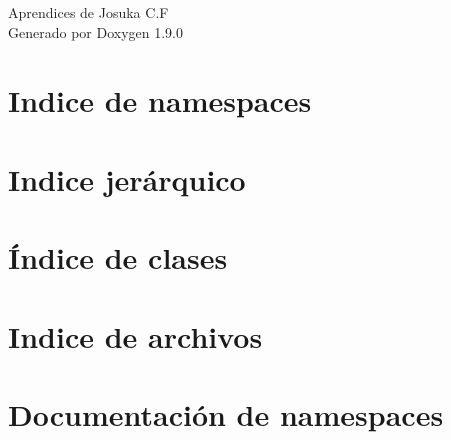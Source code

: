 \let\mypdfximage\pdfximage\def\pdfximage{\immediate\mypdfximage}\documentclass[twoside]{book}
\newcommand{\+}{\discretionary{\mbox{\scriptsize$\hookleftarrow$}}{}{}}
\newcommand{\clearemptydoublepage}{%
  \newpage{\pagestyle{empty}\cleardoublepage}%
}
\begin{document}
\raggedbottom

\hypersetup{pageanchor=false,
             bookmarksnumbered=true,
             pdfencoding=unicode
            }
\begin{titlepage}
\vspace*{7cm}
\begin{center}%
{\Large Aprendices de Josuka C.\+F }\\
\vspace*{1cm}
{\large Generado por Doxygen 1.9.0}\\
\end{center}
\end{titlepage}
\clearemptydoublepage
{}
\tableofcontents
\clearemptydoublepage
{}
\hypersetup{pageanchor=true}

\chapter{Indice de namespaces}

\chapter{Indice jerárquico}

\chapter{Índice de clases}

\chapter{Indice de archivos}

\chapter{Documentación de namespaces}



















\end{document}
